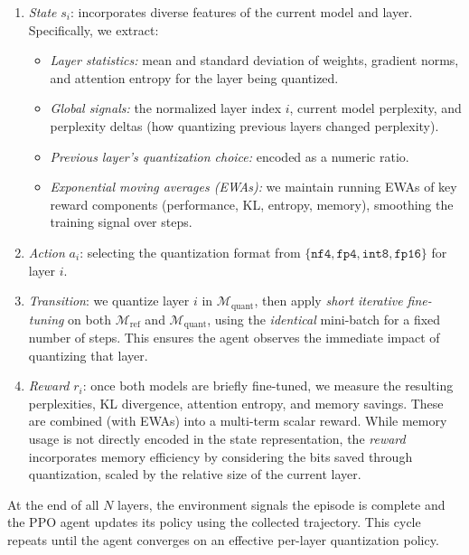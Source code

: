 \documentclass{article}
\begin{document}
	\begin{enumerate}
		\item \textit{State} $s_i$: incorporates diverse features of the current model and layer. Specifically, we extract:
		\begin{itemize}
			\item \emph{Layer statistics:} mean and standard deviation of weights, gradient norms, and attention entropy for the layer being quantized.
			\item \emph{Global signals:} the normalized layer index $i$, current model perplexity, and perplexity deltas (how quantizing previous layers changed perplexity).
			\item \emph{Previous layer's quantization choice:} encoded as a numeric ratio.
			\item \emph{Exponential moving averages (EWAs):} we maintain running EWAs of key reward components (performance, KL, entropy, memory), smoothing the training signal over steps.
		\end{itemize}
		
		\item \textit{Action} $a_i$: selecting the quantization format from $\{\texttt{nf4}, \texttt{fp4}, \texttt{int8}, \texttt{fp16}\}$ for layer $i$.
		
		\item \textit{Transition}: we quantize layer $i$ in $\mathcal{M}_{\text{quant}}$, then apply \emph{short iterative fine-tuning} on both $\mathcal{M}_{\text{ref}}$ and $\mathcal{M}_{\text{quant}}$, using the \emph{identical} mini-batch for a fixed number of steps. This ensures the agent observes the immediate impact of quantizing that layer.
		
		\item \textit{Reward} $r_i$: once both models are briefly fine-tuned, we measure the resulting perplexities, KL divergence, attention entropy, and memory savings. These are combined (with EWAs) into a multi-term scalar reward. While memory usage is not directly encoded in the state representation, the \emph{reward} incorporates memory efficiency by considering the bits saved through quantization, scaled by the relative size of the current layer.
	\end{enumerate}
	
	At the end of all $N$ layers, the environment signals the episode is complete and the PPO agent updates its policy using the collected trajectory. This cycle repeats until the agent converges on an effective per-layer quantization policy.
	
\end{document}
